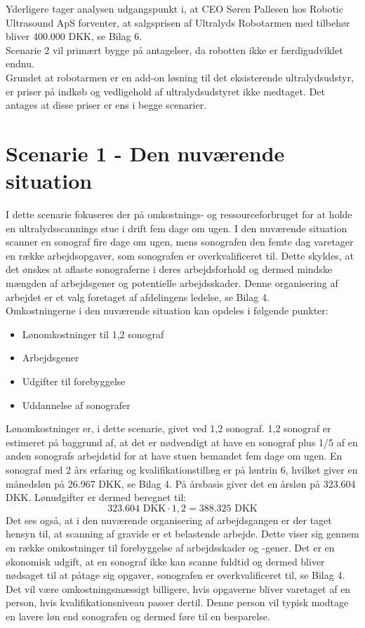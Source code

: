 Yderligere tager analysen udgangspunkt i, at CEO Søren Pallesen hos Robotic Ultrasound ApS forventer, at salgsprisen af Ultralyds Robotarmen med tilbehør bliver 400.000 DKK, se Bilag 6. \\
Scenarie 2 vil primært bygge på antagelser, da robotten ikke er færdigudviklet endnu. \\
Grundet at robotarmen er en add-on løsning til det eksisterende ultralydsudstyr, er priser på indkøb og vedligehold af ultralydsudstyret ikke medtaget. Det antages at disse priser er ens i begge scenarier. 

\section{Scenarie 1 - Den nuværende situation} \label{nuvaerende}
I dette scenarie fokuseres der på omkostnings- og ressourceforbruget for at holde en ultralydsscannings stue i drift fem dage om ugen. I den nuværende situation scanner en sonograf fire dage om ugen, mens sonografen den femte dag varetager en række arbejdsopgaver, som sonografen er overkvalificeret til. Dette skyldes, at det ønskes at aflaste sonograferne i deres arbejdsforhold og dermed mindske mængden af arbejdsgener og potentielle arbejdsskader. Denne organisering af arbejdet er et valg foretaget af afdelingens ledelse, se Bilag 4. \\ 
Omkostningerne i den nuværende situation kan opdeles i følgende punkter:

\begin{itemize}
\item Lønomkostninger til 1,2 sonograf
\item Arbejdsgener 
\item Udgifter til forebyggelse
\item Uddannelse af sonografer
\end{itemize}
Lønomkostninger er, i dette scenarie, givet ved 1,2 sonograf. 1,2 sonograf er estimeret på baggrund af, at det er nødvendigt at have en sonograf plus 1/5 af en anden sonografs arbejdstid for at have stuen bemandet fem dage om ugen. En sonograf med 2 års erfaring og kvalifikationstillæg er på løntrin 6, hvilket giver en månedsløn på 26.967 DKK, se Bilag 4. På årsbasis giver det en årsløn på 323.604 DKK. Lønudgifter er dermed beregnet til:
\begin{equation}
323.604 \text{ DKK}\cdot1,2 = 388.325 \text{ DKK}
\end{equation}
Det ses også, at i den nuværende organisering af arbejdsgangen er der taget hensyn til, at scanning af gravide er et belastende arbejde. Dette viser sig gennem en række omkostninger til forebyggelse af arbejdsskader og -gener. Det er en økonomisk udgift, at en sonograf ikke kan scanne fuldtid og dermed bliver nødsaget til at påtage sig opgaver, sonografen er overkvalificeret til, se Bilag 4. Det vil være omkostningsmæssigt billigere, hvis opgaverne bliver varetaget af en person, hvis kvalifikationsniveau passer dertil. Denne person vil typisk modtage en lavere løn end sonografen og dermed føre til en besparelse.


